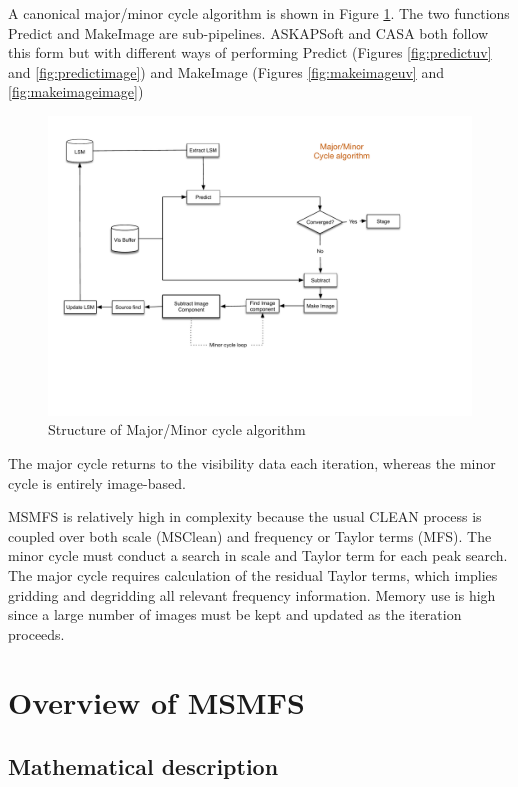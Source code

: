 \documentclass[11pt,a4paper]{article}
\begin{document}
A canonical major/minor cycle algorithm is shown in Figure \ref{fig:majorminor}. The two functions Predict and MakeImage are sub-pipelines. ASKAPSoft and CASA both follow this form but with different ways of performing Predict (Figures \ref{fig:predictuv} and \ref{fig:predictimage}) and MakeImage (Figures \ref{fig:makeimageuv} and \ref{fig:makeimageimage})

\begin{figure}[htb]
  \centering
  \includegraphics[width=\textwidth]{./MSMFS_MajorMinor.pdf}
  \caption{Structure of Major/Minor cycle algorithm}
  \label{fig:majorminor}
\end{figure}

The major cycle returns to the visibility data each iteration, whereas the minor cycle is entirely image-based.

MSMFS is relatively high in complexity because the usual CLEAN process is coupled over both scale (MSClean) and frequency or Taylor terms (MFS). The minor cycle must conduct a search in scale and Taylor term for each peak search. The major cycle requires calculation of the residual Taylor terms, which implies gridding and degridding all relevant frequency information. Memory use is high since a large number of images must be kept and updated as the iteration proceeds.



\clearpage
\section{Overview of MSMFS}
\label{sec:overview}

\subsection{Mathematical description}
\end{document}
